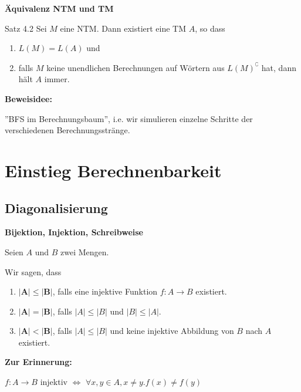 \documentclass[a4paper, 11pt]{article}
\begin{document}
        
        
            \textbf{Äquivalenz NTM und TM}
            \begin{mainbox}{Satz 4.2}
                Sei $M$ eine NTM. Dann existiert eine TM $A$, so dass 
                \begin{enumerate}[label=(\roman*)]
                    \item $L(M) = L(A)$ und 
                    \item falls $M$ keine unendlichen Berechnungen auf Wörtern aus $L(M)^\complement$ hat, dann hält $A$ immer.
                \end{enumerate}
            \end{mainbox}
            \textbf{Beweisidee:} 
            
            ''BFS im Berechnungsbaum'', i.e. wir simulieren einzelne Schritte der verschiedenen Berechnungsstränge.
        
        
        \section{Einstieg Berechnenbarkeit}
        
        \subsection{Diagonalisierung}
        
        
            \textbf{Bijektion, Injektion, Schreibweise}
            \begin{mainbox}{}
                Seien $A$ und $B$ zwei Mengen.
        
                Wir sagen, dass 
                \begin{enumerate}[label=\roman*.]
                    \item $\mathbf{|A| \leq |B|}$, falls eine injektive Funktion $f: A \to B$ existiert.
                    \item $\mathbf{|A| = |B|}$, falls $|A| \leq |B|$ und $|B| \leq |A|$.
                    \item $\mathbf{|A| < |B|}$, falls $|A| \leq |B|$ und keine injektive Abbildung von $B$ nach $A$ existiert.
                \end{enumerate}
            \end{mainbox}
            \textbf{Zur Erinnerung:}
            \begin{center}
                $f: A \to B$ injektiv $\iff $ $\forall x,y \in A, x\neq y. f(x) \neq f(y)$
            \end{center}
        
\end{document}
